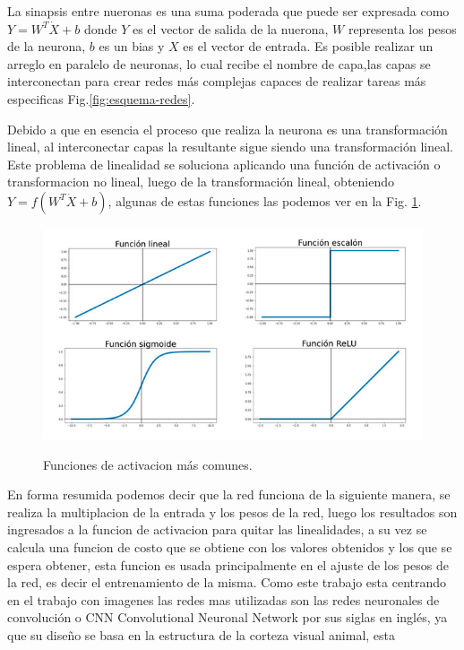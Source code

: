 La sinapsis entre nueronas es una suma poderada que puede ser expresada como $Y =W^T\dot X + b$ donde $Y$ es el vector de salida de la nuerona,
 $W$ representa los pesos de la neurona, $b$ es un bias y $X$ es el vector de entrada.
Es posible realizar un arreglo en paralelo de neuronas, lo cual recibe el nombre de capa,las capas se interconectan para crear redes 
más complejas capaces de realizar tareas más especificas Fig.\ref*{fig:esquema-redes}.

Debido a que en esencia el proceso que realiza la neurona es una transformación lineal, al interconectar capas la resultante sigue siendo 
una transformación lineal. Este problema de linealidad se soluciona aplicando una función de activación o transformacion no lineal,
luego de la transformación lineal, obteniendo $Y= f(W^T \dot X + b)$, algunas de estas funciones las podemos ver en la 
Fig. \ref*{fig:funciones-activacion}.
\begin{figure}
    \centering
    \includegraphics[width=1\textwidth]{imgs/Funciones-de-activacion.jpg}
    \label{fig:funciones-activacion}
    \caption{Funciones de activacion más comunes.}
\end{figure}
En forma resumida podemos decir que la red funciona de la siguiente manera, se realiza la multiplacion de la entrada y los pesos de la red,
luego los resultados son ingresados a la funcion de activacion para quitar las linealidades, a su vez se calcula una funcion de costo que se obtiene 
con los valores obtenidos y los que se espera obtener, esta funcion es usada principalmente en el ajuste de los pesos de la red, es decir el 
entrenamiento de la misma.
Como este trabajo esta centrando en el trabajo con imagenes las redes mas utilizadas son las redes neuronales de convolución o 
CNN Convolutional Neuronal Network por sus siglas en inglés, ya que su diseño se basa en la estructura de la corteza visual animal, esta 

